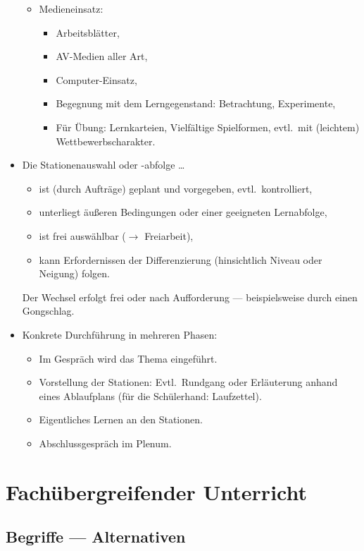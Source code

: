 \begin{itemize}
\begin{itemize}
\item Medieneinsatz:
\begin{itemize}
\item Arbeitsbl\"{a}tter,
\item AV-Medien aller Art,
\item Computer-Einsatz,
\item Begegnung mit dem Lerngegenstand: Betrachtung, Experimente,
\item F\"{u}r \"{U}bung: Lernkarteien, Vielf\"{a}ltige Spielformen, evtl.\ mit (leichtem) Wettbewerbscharakter.
\end{itemize}
\end{itemize}

\item Die Stationenauswahl oder -abfolge \dots
\begin{itemize}
\item ist (durch Auftr\"{a}ge) geplant und vorgegeben, evtl.\ kontrolliert,
\item unterliegt \"{a}u{\ss}eren Bedingungen oder einer geeigneten Lernabfolge,
\item ist frei ausw\"{a}hlbar ($\to$ Freiarbeit),
\item kann Erfordernissen der Differenzierung (hinsichtlich Niveau oder Neigung) folgen.
\end{itemize}

Der Wechsel erfolgt frei oder nach Aufforderung --- beispielsweise durch einen Gongschlag.
\item
Konkrete Durchf\"{u}hrung in mehreren Phasen:
\begin{itemize}
\item Im Gespr\"{a}ch wird das Thema eingef\"{u}hrt.
\item Vorstellung der Stationen: Evtl.\ Rundgang oder Erl\"{a}uterung anhand eines Ablaufplans
(f\"{u}r die Sch\"{u}lerhand: Laufzettel).
\item Eigentliches Lernen an den Stationen.
\item Abschlussgespr\"{a}ch im Plenum.

\end{itemize}

\end{itemize}

\bip\bip
\section{Fach\"{u}bergreifender Unterricht}
\subsection{Begriffe --- Alternativen}

